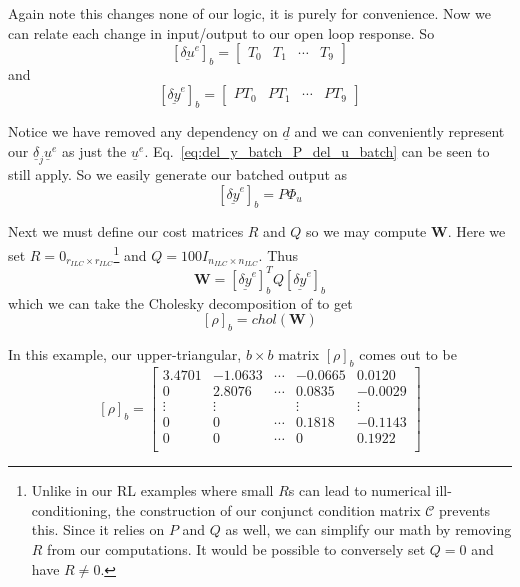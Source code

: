 Again note this changes none of our logic, it is purely for convenience. Now we can relate each change in input/output to our open loop response. So 
\begin{equation}
    {\left[\underline{\delta u}^e\right]}_b =
    \begin{bmatrix}
        T_0 & T_1 & \cdots & T_9
    \end{bmatrix}
\end{equation}
and
\begin{equation}
    {\left[\underline{\delta y}^e\right]}_b  = 
    \begin{bmatrix}
        PT_0 & PT_1 & \cdots & PT_9
    \end{bmatrix}
\end{equation}

Notice we have removed any dependency on $\underline{d}$ and we can conveniently represent our $\underline{\delta}_j\underline{u}^e$ as just the $\underline{u}^e$. Eq.~\ref{eq:del_y_batch_P_del_u_batch} can be seen to still apply. So we easily generate our batched output as
\begin{equation}
    {\left[\underline{\delta y}^e\right]}_b  = P\Phi_u
\end{equation}

Next we must define our cost matrices $R$ and $Q$ so we may compute \textbf{W}. Here we set $R = 0_{r_{ILC} \times r_{ILC}}$\footnote{Unlike in our RL examples where small $R$s can lead to numerical ill-conditioning, the construction of our conjunct condition matrix $\mathcal{C}$ prevents this. Since it relies on $P$ and $Q$ as well, we can simplify our math by removing $R$ from our computations. It would be possible to conversely set $Q = 0$ and have $R \neq 0$.} and $Q = 100I_{n_{ILC} \times n_{ILC}}$. Thus
\begin{equation}
    \textbf{W} = {\left[\underline{\delta y}^e\right]}_b^T Q {\left[\underline{\delta y}^e\right]}_b
\end{equation}
which we can take the Cholesky decomposition of to get
\begin{equation}
    {\left[\rho\right]}_b = chol(\textbf{W})
\end{equation}

In this example, our upper-triangular, $b \times b$ matrix ${\left[\rho\right]}_b$ comes out to be
\begin{equation}
    {\left[\rho\right]}_b = 
    \begin{bmatrix}
        3.4701 &  -1.0633 & \cdots & -0.0665  &  0.0120 \\
        0  &  2.8076 & \cdots & 0.0835 &  -0.0029 \\
        \vdots & \vdots &  & \vdots & \vdots \\
        0 &  0 & \cdots & 0.1818 &  -0.1143 \\
        0  &  0 & \cdots & 0 &  0.1922 \\
    \end{bmatrix}
\end{equation}


